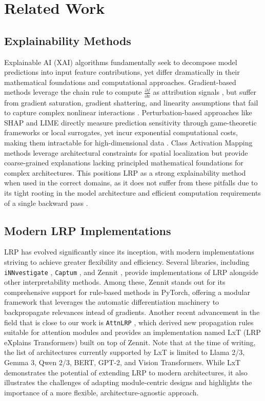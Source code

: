\documentclass{article}
\begin{document}
\section{Related Work}
\subsection{Explainability Methods}
Explainable AI (XAI) algorithms fundamentally seek to decompose model predictions into input feature contributions, yet
differ dramatically in their mathematical foundations and computational approaches. Gradient-based methods leverage the
chain rule to compute $\frac{\partial f}{\partial x}$ as attribution signals \cite{simonyan2014deep, sundararajan2017axiomatic, smilkov2017smoothgrad},
but suffer from gradient saturation, gradient shattering, and linearity assumptions that fail to capture complex nonlinear interactions
\cite{ancona2018towards, samek2021xaireview}. Perturbation-based approaches like SHAP \cite{lundberg2017unified} and LIME
\cite{ribeiro2016should} directly measure prediction sensitivity through game-theoretic frameworks or local surrogates,
yet incur exponential computational costs, making them intractable for high-dimensional data \cite{covert2020understanding}.
Class Activation Mapping methods \cite{zhou2016learning, selvaraju2017grad} leverage architectural constraints for spatial
localization but provide coarse-grained explanations lacking principled mathematical foundations for complex architectures.
This positions LRP as a strong explainability method when used in the correct domains, as it does not suffer from these
pitfalls due to its tight rooting in the model architecture and efficient computation requirements of a single backward
pass \cite{samek2021xaireview}.

\subsection{Modern LRP Implementations}
LRP has evolved significantly since its inception, with modern implementations striving to achieve greater flexibility and efficiency.
Several libraries, including \texttt{iNNvestigate} \cite{alber2018innvestigate}, \texttt{Captum} \cite{kokhlikyan2020captum}, and Zennit 
\cite{anders2021zennit}, provide implementations of LRP alongside other interpretability methods.
Among these, Zennit stands out for its comprehensive support for rule-based methods in PyTorch, offering a modular framework that leverages
the automatic  differentiation machinery to backpropagate relevances intead of gradients. Another recent advancement in the field that 
is close to our work is \texttt{AttnLRP} \cite{achtibat2024attnlrp}, which derived new propagation rules suitable for attention modules 
and provides an implementation named LxT (LRP eXplains Transformers) built on top of Zennit. Note that at the time of writing, the list of 
architectures currently supported by LxT is limited to Llama 2/3, Gemma 3, Qwen 2/3, BERT, GPT-2, and Vision Transformers. While LxT 
demonstrates the potential of extending LRP to modern architectures, it also illustrates the challenges of adapting module-centric designs 
and  highlights the importance of a more flexible, architecture-agnostic approach.
\end{document}
